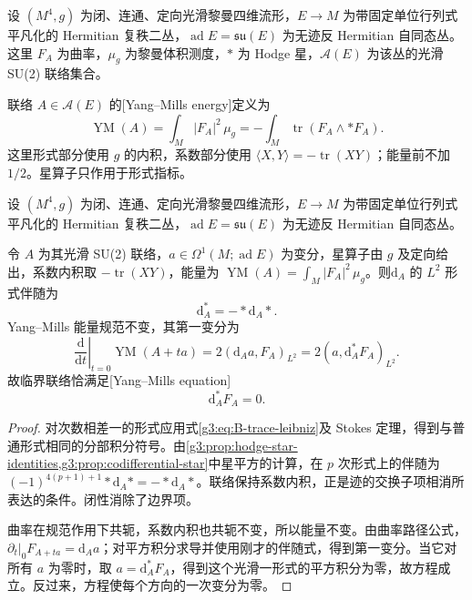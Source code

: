 \begin{definition}\label{g3:def:B-yang-mills-energy}
	设 \((M^4,g)\) 为闭、连通、定向光滑黎曼四维流形，\(E\to M\) 为带固定单位行列式平凡化的 Hermitian 复秩二丛，\(\operatorname{ad}E=\mathfrak{su}(E)\) 为无迹反 Hermitian 自同态丛。
	这里 \(F_A\) 为曲率，\(\mu_g\) 为黎曼体积测度，\(*\) 为 Hodge 星，\(\mathcal A(E)\) 为该丛的光滑 SU(2) 联络集合。

	联络 \(A\in\mathcal A(E)\) 的[Yang--Mills energy]定义为
	\begin{equation}\label{g3:eq:B-yang-mills-energy}
		\operatorname{YM}(A)=\int_M|F_A|^2\,\mu_g
		=-\int_M\operatorname{tr}(F_A\wedge *F_A).
	\end{equation}
	这里形式部分使用 \(g\) 的内积，系数部分使用 \(\langle X,Y\rangle=-\operatorname{tr}(XY)\)；能量前不加 \(1/2\)。星算子只作用于形式指标。
\end{definition}

\begin{proposition}\label{g3:prop:B-yang-mills-equation}
	设 \((M^4,g)\) 为闭、连通、定向光滑黎曼四维流形，\(E\to M\) 为带固定单位行列式平凡化的 Hermitian 复秩二丛，\(\operatorname{ad}E=\mathfrak{su}(E)\) 为无迹反 Hermitian 自同态丛。

	令 \(A\) 为其光滑 SU(2) 联络，\(a\in\Omega^1(M;\operatorname{ad}E)\) 为变分，星算子由 \(g\) 及定向给出，系数内积取 \(-\operatorname{tr}(XY)\)，能量为 \(\operatorname{YM}(A)=\int_M|F_A|^2\,\mu_g\)。则\(\mathrm d_A\) 的 \(L^2\) 形式伴随为
	\[
		\mathrm d_A^*=-*\mathrm d_A*.
	\]
	Yang--Mills 能量规范不变，其第一变分为
	\begin{equation}\label{g3:eq:B-yang-mills-first-variation}
		\left.\frac{\mathrm d}{\mathrm dt}\right|_{t=0}
		 \operatorname{YM}(A+ta)
		=2(\mathrm d_Aa,F_A)_{L^2}
		=2(a,\mathrm d_A^*F_A)_{L^2}.
	\end{equation}
	故临界联络恰满足[Yang--Mills equation]
	\begin{equation}\label{g3:eq:B-yang-mills-equation}
		\mathrm d_A^*F_A=0.
	\end{equation}
\end{proposition}
\begin{proof}
	对次数相差一的形式应用式\eqref{g3:eq:B-trace-leibniz}及 Stokes 定理，得到与普通形式相同的分部积分符号。由\cref{g3:prop:hodge-star-identities,g3:prop:codifferential-star}中星平方的计算，在 \(p\) 次形式上的伴随为
	\((-1)^{4(p+1)+1}*\mathrm d_A*=-*\mathrm d_A*\)。联络保持系数内积，正是迹的交换子项相消所表达的条件。闭性消除了边界项。

	曲率在规范作用下共轭，系数内积也共轭不变，所以能量不变。由曲率路径公式，
	\(\left.\partial_t\right|_0F_{A+ta}=\mathrm d_Aa\)；对平方积分求导并使用刚才的伴随式，得到第一变分。当它对所有 \(a\) 为零时，取 \(a=\mathrm d_A^*F_A\)，得到这个光滑一形式的平方积分为零，故方程成立。反过来，方程使每个方向的一次变分为零。
\end{proof}

